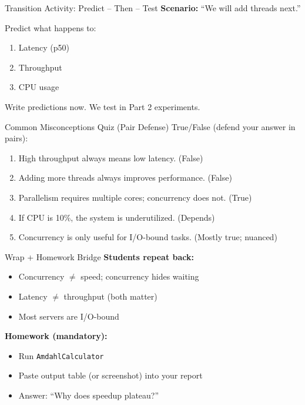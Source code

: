 \documentclass[11pt]{beamer}
\begin{document}
	\begin{frame}{Transition Activity: Predict -- Then -- Test}
		\textbf{Scenario:} ``We will add threads next.''
		
		Predict what happens to:
		\begin{enumerate}
			\item Latency (p50)
			\item Throughput
			\item CPU usage
		\end{enumerate}
		

		Write predictions now. We test in Part 2 experiments.
	\end{frame}
	
	\begin{frame}{Common Misconceptions Quiz (Pair Defense)}
		True/False (defend your answer in pairs):
		\begin{enumerate}
			\item High throughput always means low latency. (False)
			\item Adding more threads always improves performance. (False)
			\item Parallelism requires multiple cores; concurrency does not. (True)
			\item If CPU is 10\%, the system is underutilized. (Depends)
			\item Concurrency is only useful for I/O-bound tasks. (Mostly true; nuanced)
		\end{enumerate}
	\end{frame}
	
	\begin{frame}{Wrap + Homework Bridge}
		\textbf{Students repeat back:}
		\begin{itemize}
			\item Concurrency $\neq$ speed; concurrency hides waiting
			\item Latency $\neq$ throughput (both matter)
			\item Most servers are I/O-bound
		\end{itemize}
		

		\textbf{Homework (mandatory):}
		\begin{itemize}
			\item Run \texttt{AmdahlCalculator}
			\item Paste output table (or screenshot) into your report
			\item Answer: ``Why does speedup plateau?''
		\end{itemize}
	\end{frame}
	
\end{document}
